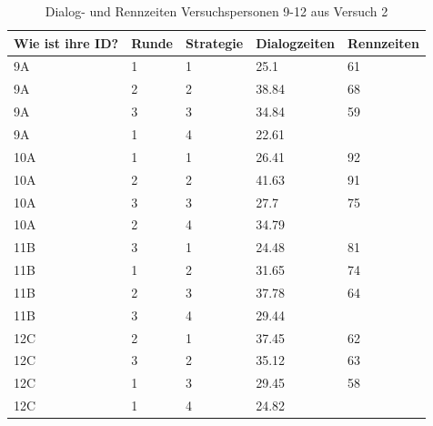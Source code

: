 \documentclass[12pt,a4paper]{scrartcl}
\begin{document}
\begin{appendix}
\begin{table}
\begin{tabular}{ | l | l | l | l | l | }
\end{tabular}

\end{table}

\begin{table}
\centering
\caption{Dialog- und Rennzeiten Versuchspersonen 9-12 aus Versuch 2}
\begin{tabular}{ | l | l | l | l | l | }
\hline
	Wie ist ihre ID? & Runde & Strategie & Dialogzeiten & Rennzeiten \\ \hline \hline
	9A & 1 & 1 & 25.1 & 61 \\ \hline
	9A & 2 & 2 & 38.84 & 68 \\ \hline
	9A & 3 & 3 & 34.84 & 59 \\ \hline
	9A & 1 & 4 & 22.61 &  \\ \hline \hline
	10A & 1 & 1 & 26.41 & 92 \\ \hline
	10A & 2 & 2 & 41.63 & 91 \\ \hline
	10A & 3 & 3 & 27.7 & 75 \\ \hline
	10A & 2 & 4 & 34.79 &  \\ \hline \hline
	11B & 3 & 1 & 24.48 & 81 \\ \hline
	11B & 1 & 2 & 31.65 & 74 \\ \hline
	11B & 2 & 3 & 37.78 & 64 \\ \hline
	11B & 3 & 4 & 29.44 &  \\ \hline \hline
	12C & 2 & 1 & 37.45 & 62 \\ \hline
	12C & 3 & 2 & 35.12 & 63 \\ \hline
	12C & 1 & 3 & 29.45 & 58 \\ \hline
	12C & 1 & 4 & 24.82 &  \\ \hline

\end{tabular}

\end{table}



\end{appendix}
\end{document}
